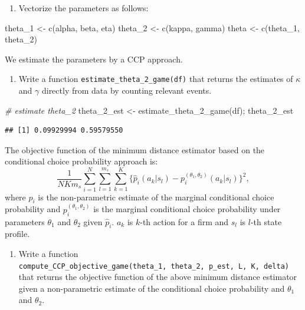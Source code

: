 \documentclass[
]{book}
\newenvironment{Shaded}{\begin{snugshade}}{\end{snugshade}}
\newcommand{\CommentTok}[1]{\textcolor[rgb]{0.56,0.35,0.01}{\textit{#1}}}
\newcommand{\FunctionTok}[1]{\textcolor[rgb]{0.00,0.00,0.00}{#1}}
\newcommand{\NormalTok}[1]{#1}
\newcommand{\OtherTok}[1]{\textcolor[rgb]{0.56,0.35,0.01}{#1}}
\providecommand{\tightlist}{%
  \setlength{\itemsep}{0pt}\setlength{\parskip}{0pt}}
\begin{document}
\begin{enumerate}
\def\labelenumi{\arabic{enumi}.}
\tightlist
\item
  Vectorize the parameters as follows:
\end{enumerate}

\begin{Shaded}
\begin{Highlighting}[]
\NormalTok{theta\_1 }\OtherTok{\textless{}{-}} \FunctionTok{c}\NormalTok{(alpha, beta, eta)}
\NormalTok{theta\_2 }\OtherTok{\textless{}{-}} \FunctionTok{c}\NormalTok{(kappa, gamma)}
\NormalTok{theta }\OtherTok{\textless{}{-}} \FunctionTok{c}\NormalTok{(theta\_1, theta\_2)}
\end{Highlighting}
\end{Shaded}

We estimate the parameters by a CCP approach.

\begin{enumerate}
\def\labelenumi{\arabic{enumi}.}
\tightlist
\item
  Write a function \texttt{estimate\_theta\_2\_game(df)} that returns the estimates of \(\kappa\) and \(\gamma\) directly from data by counting relevant events.
\end{enumerate}

\begin{Shaded}
\begin{Highlighting}[]
\CommentTok{\# estimate theta\_2}
\NormalTok{theta\_2\_est }\OtherTok{\textless{}{-}} \FunctionTok{estimate\_theta\_2\_game}\NormalTok{(df); theta\_2\_est}
\end{Highlighting}
\end{Shaded}

\begin{verbatim}
## [1] 0.09929994 0.59579550
\end{verbatim}

The objective function of the minimum distance estimator based on the conditional choice probability approach is:
\[
\frac{1}{N K m_s} \sum_{i = 1}^N \sum_{l = 1}^{m_s} \sum_{k = 1}^{K}\{\hat{p}_i(a_k|s_l) - p_i^{(\theta_1, \theta_2)}(a_k|s_l)\}^2,
\]
where \(\hat{p}_i\) is the non-parametric estimate of the marginal conditional choice probability and \(p_i^{(\theta_1, \theta_2)}\) is the marginal conditional choice probability under parameters \(\theta_1\) and \(\theta_2\) given \(\hat{p}_i\). \(a_k\) is \(k\)-th action for a firm and \(s_l\) is \(l\)-th state profile.

\begin{enumerate}
\def\labelenumi{\arabic{enumi}.}
\setcounter{enumi}{1}
\tightlist
\item
  Write a function \texttt{compute\_CCP\_objective\_game(theta\_1,\ theta\_2,\ p\_est,\ L,\ K,\ delta)} that returns the objective function of the above minimum distance estimator given a non-parametric estimate of the conditional choice probability and \(\theta_1\) and \(\theta_2\).
\end{enumerate}
\end{document}
